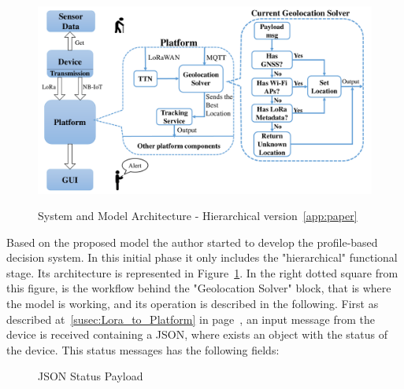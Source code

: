\begin{figure}[htbp]
  \centering
  
    {\includegraphics[width=0.7\linewidth]{Chapters/Figures/modelarch.pdf}}%
  \caption{System and Model Architecture - Hierarchical version~\ref{app:paper}}
  \label{fig:Model_overview}
\end{figure}
Based on the proposed model the author started to
develop the profile-based decision system. In this initial phase it
only includes the "hierarchical" functional stage. Its
architecture is represented in Figure~\ref{fig:Model_overview}. 
In the right dotted square from this figure, is the workflow behind the "Geolocation Solver" block, that is  where the model is working, and its operation is described in the following.
First as described at~\ref{susec:Lora_to_Platform} in page~\pageref{susec:Lora_to_Platform}, an input message from the device is received containing a JSON, where exists an object with the status of the device. This status messages has the following fields:
\begin{figure}[htbp]
  \centering
  \caption{JSON Status Payload}
  \label{fig:JSON_Status}
\end{figure}

